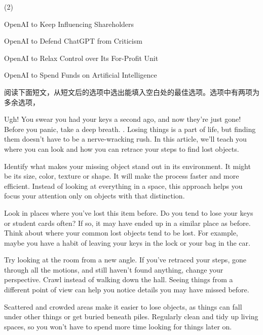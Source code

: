 \documentclass{英语试卷}
\begin{document}
\begin{choices}(2)
  \item OpenAI to Keep Influencing Shareholders
  \item OpenAI to Defend ChatGPT from Criticism
  \item OpenAI to Relax Control over Its For-Profit Unit
  \item OpenAI to Spend Funds on Artificial Intelligence
\end{choices}
\par 阅读下面短文，从短文后的选项中选出能填入空白处的最佳选项。选项中有两项为多余选项，\par
\par Ugh! You swear you had your keys a second ago, and now they're just gone! Before you panic, take a deep breath. . Losing things is a part of life, but finding them doesn't have to be a nerve-wracking rush. In this article, we'll teach you where you can look and how you can retrace your steps to find lost objects.\par
\par Identify what makes your missing object stand out in its environment. It might be its size, color, texture or shape.  It will make the process faster and more efficient. Instead of looking at everything in a space, this approach helps you focus your attention only on objects with that distinction.\par
\par Look in places where you've lost this item before. Do you tend to lose your keys or student cards often? If so, it may have ended up in a similar place as before. Think about where your common lost objects tend to be lost. For example, maybe you have a habit of leaving your keys in the lock or your bag in the car. \par
\par Try looking at the room from a new angle. If you've retraced your steps, gone through all the motions, and still haven't found anything, change your perspective. Crawl instead of walking down the hall.  Seeing things from a different point of view can help you notice details you may have missed before.\par
\par {} Scattered and crowded areas make it easier to lose objects, as things can fall under other things or get buried beneath piles. Regularly clean and tidy up living spaces, so you won't have to spend more time looking for things later on.\par
\end{document}

